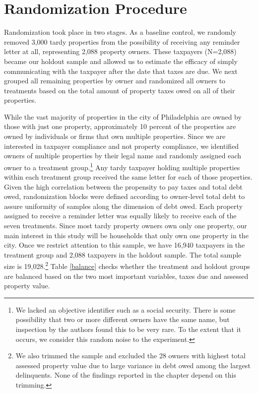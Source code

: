   
\section{Randomization Procedure}

Randomization took place in two stages.  As a baseline control, we
randomly removed 3,000 tardy properties from the possibility of
receiving any reminder letter at all, representing 2,088 property owners.  These taxpayers (N=2,088)
became our holdout sample and allowed us to estimate the efficacy of
simply communicating with the taxpayer after the date that taxes are
due. We next grouped all remaining properties by owner and randomized all owners to treatments based on the total amount of
property taxes owed on all of their properties. 

While the vast majority of properties in the city of Philadelphia are
owned by those with just one property, approximately 10 percent of the properties are
owned by individuals or firms that own multiple properties. Since we
are interested in taxpayer compliance and not property compliance, we
identified owners of multiple properties by their legal
name and randomly assigned each owner to a treatment
group.\footnote{We lacked an objective identifier such as a social
  security.  There is some possibility that two or more different
  owners have the same name, but inspection by the authors found this
  to be very rare.  To the extent that it occurs, we consider this
  random noise to the experiment.} Any tardy taxpayer holding
multiple properties within each treatment group received the same
letter for each of those properties.  Given the high correlation
between the propensity to pay taxes and total debt owed, randomization
blocks were defined according to owner-level total debt to assure
uniformity of samples along the dimension of debt owed. Each property
assigned to receive a reminder letter was equally likely to receive
each of the seven treatments. Since most tardy property owners own only one property, our main
interest in this study will be households that only
own one property in the city. Once we restrict attention to this
sample, we have 16,940 taxpayers in the treatment group and 2,088
taxpayers in the holdout sample.  The total sample size is
19,028.\footnote{We also trimmed the sample and excluded the 28 owners
  with highest total assessed property value due to large variance in debt 
  owed among the largest delinquents. None of the findings
  reported in the chapter depend on this trimming.}  Table \ref{balance}
checks whether the treatment and holdout groups are balanced based on
the two most important variables, taxes due and assessed property
value.

